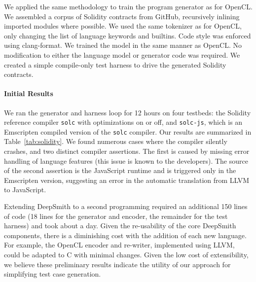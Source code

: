 We applied the same methodology to train the program generator as for OpenCL. We
assembled a corpus of Solidity contracts from GitHub, recursively inlining
imported modules where  possible. We used the same tokenizer as for OpenCL, only
changing the list of language keywords and builtins. Code style was enforced
using clang-format. We trained the model in the same manner as OpenCL. No
modification to either the language model or generator code was required. We
created a simple compile-only test harness to drive the generated Solidity
contracts.

\paragraph{Initial Results}

We ran the generator and harness loop for 12 hours on four testbeds: the
Solidity reference compiler \texttt{solc} with optimizations on or off, and
\texttt{solc-js}, which is an Emscripten compiled version of the \texttt{solc}
compiler. Our results are summarized in Table~\ref{tab:solidity}. We found
numerous cases where the compiler silently crashes, and two distinct compiler
assertions. The first is caused by missing error handling of language features
(this issue is known to the developers). The source of the second assertion is
the JavaScript runtime and is triggered only in the Emscripten version,
suggesting an error in the automatic translation from LLVM to JavaScript.

Extending DeepSmith to a second programming required an additional 150 lines of
code (18 lines for the generator and encoder, the remainder for the test
harness) and took about a day. Given the re-usability of the core DeepSmith
components, there is a diminishing cost with the addition of each new language.
For example, the OpenCL encoder and re-writer, implemented using LLVM, could be
adapted to C with minimal changes. Given the low cost of extensibility, we
believe these preliminary results indicate the utility of our approach for
simplifying test case generation.
